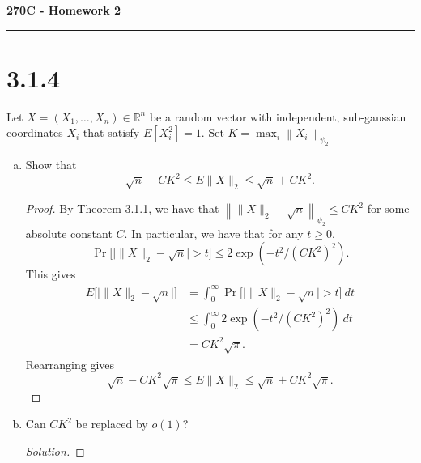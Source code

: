 \documentclass[11pt,letterpaper]{report}
\newcommand{\reals}{\mathbb{R}}
\newcommand{\subg}[1]{\left\|{#1}\right\|_{\psi_2}}
\newenvironment{solution}
{\begin{proof}[Solution]}
{\end{proof}}
\begin{document}
\begin{center}
{\bf \Large 270C - Homework 2}
\vspace{0.2cm}
\hrule
\end{center}
\section*{3.1.4}
Let $X = (X_1, \ldots, X_n)\in \reals^n$ be a random vector with independent, sub-gaussian coordinates $X_i$ that satisfy $E[X_i^2] = 1$. Set $K = \max_i \subg{X_i}$
\begin{enumerate}[(a)]
	\item Show that
	\[
	\sqrt{n}-CK^2 \leq E \|X\|_2 \leq \sqrt{n} + CK^2.
	\]
	
	\begin{proof}
		By Theorem 3.1.1, we have that $\subg{\|X\|_2 - \sqrt{n}} \leq CK^2$ for some absolute constant $C$. In particular, we have that for any $t\geq 0$,
		\[
		\Pr\big[\big|\|X\|_2 - \sqrt{n}\big| > t\big] \leq 2\exp(-t^2/(CK^2)^2).
		\]
		This gives
		\begin{align*}
			E\big[\big|\|X\|_2 - \sqrt{n}\big|\big] &= \int_0^\infty \Pr\big[\big|\|X\|_2 - \sqrt{n}\big| > t\big]\ dt\\
			&\leq \int_0^\infty 2\exp(-t^2/(CK^2)^2)\ dt\\
			&= CK^2\sqrt{\pi}.
		\end{align*}
		Rearranging gives
		\[
		\sqrt{n} - CK^2\sqrt{\pi} \leq E\|X\|_2 \leq \sqrt{n} + CK^2\sqrt{\pi}.
		\]
	\end{proof}

	\item Can $CK^2$ be replaced by $o(1)$?
	\begin{solution}
		
	\end{solution}
\end{enumerate}
\end{document}
